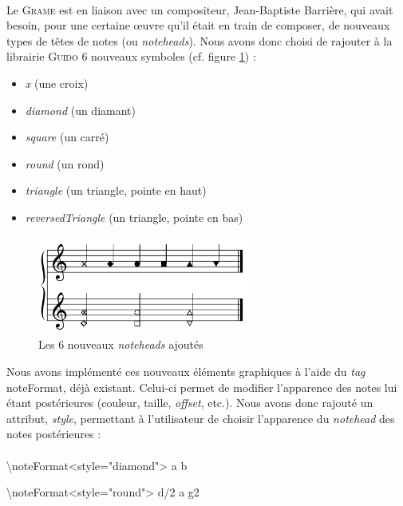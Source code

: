 \documentclass[a4paper,10pt,twocolumn]{article}
\newenvironment{code}
  {\fontfamily{pnc}\selectfont}{}
\begin{document}
\paragraph{}
Le \textsc{Grame} est en liaison avec un compositeur, Jean-Baptiste Barrière, qui avait besoin, pour une certaine œuvre qu'il était en train de composer, de nouveaux types de têtes de notes (ou \emph{noteheads}).
Nous avons donc choisi de rajouter à la librairie \textsc{Guido} 6 nouveaux symboles (cf. figure \ref{fig:noteheads}) :
%
\begin{itemize}
    \item \emph{x} (une croix)
    \item \emph{diamond} (un diamant)
    \item \emph{square} (un carré)
    \item \emph{round} (un rond)
    \item \emph{triangle} (un triangle, pointe en haut)
    \item \emph{reversedTriangle} (un triangle, pointe en bas)
\end{itemize} 
%
\begin{figure}[h]
\centering
\includegraphics[width=7cm]{img/partitions/noteheads.png}
\caption{Les 6 nouveaux \emph{noteheads} ajoutés}
\label{fig:noteheads}
\end{figure}
%
Nous avons implémenté ces nouveaux éléments graphiques à l'aide du \emph{tag} \begin{code}noteFormat\end{code}, déjà existant. Celui-ci permet de modifier l'apparence des notes lui étant postérieures (couleur, taille, \emph{offset}, etc.). Nous avons donc rajouté un attribut, \emph{style}, permettant à l'utilisateur de choisir l'apparence du \emph{notehead} des notes postérieures :
%
\paragraph{}
\begin{code}
\textbackslash{}noteFormat\textless{}style="diamond"\textgreater{} a b

\textbackslash{}noteFormat\textless{}style="round"\textgreater{} d/2 a g2
\end{code}
\end{document}
